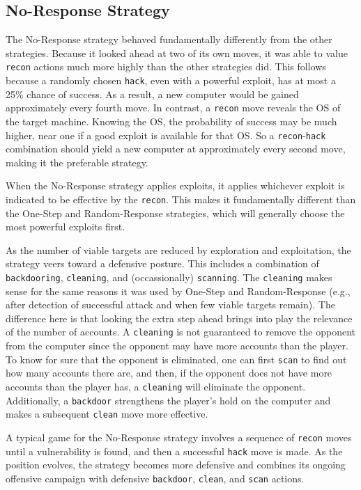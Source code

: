 \documentclass{sig-alternate-05-2015}
\begin{document}
\subsection{No-Response Strategy}
The No-Response strategy behaved fundamentally differently from the other strategies.
Because it looked ahead at two of its own moves, it was able to value {\tt recon} actions much more highly than the other strategies did.
This follows because a randomly chosen {\tt hack}, even with a powerful exploit, has at most a 25\% chance of success.
As a result, a new computer would be gained approximately every fourth move.
In contrast, a {\tt recon} move reveals the OS of the target machine.
Knowing the OS, the probability of success may be much higher, near one if a good exploit is available for that OS.
So a {\tt recon}-{\tt hack} combination should yield a new computer at approximately every second move, making it the preferable strategy.

When the No-Response strategy applies exploits, it applies whichever exploit is indicated to be effective by the {\tt recon}.
This makes it fundamentally different than the One-Step and Random-Response strategies, which will generally choose the most powerful exploits first.

As the number of viable targets are reduced by exploration and exploitation, the strategy veers toward a defensive posture.
This includes a combination of {\tt backdooring}, {\tt cleaning}, and (occassionally) {\tt scanning}.
The {\tt cleaning} makes sense for the same reasons it was used by One-Step and Random-Response (e.g., after detection of successful attack and when few viable targets remain).
The difference here is that looking the extra step ahead brings into play the relevance of the number of accounts.
A {\tt cleaning} is not guaranteed to remove the opponent from the computer since the opponent may have more accounts than the player.
To know for sure that the opponent is eliminated, one can first {\tt scan} to find out how many accounts there are, and then, if the opponent does not have more accounts than the player has, a {\tt cleaning} will eliminate the opponent.
Additionally, a {\tt backdoor} strengthens the player's hold on the computer and makes a subsequent {\tt clean} move more effective.

A typical game for the No-Response strategy involves a sequence of {\tt recon} moves until a vulnerability is found, and then a successful {\tt hack} move is made.
As the position evolves, the strategy becomes more defensive and combines its ongoing offensive campaign with defensive {\tt backdoor}, {\tt clean}, and  {\tt scan} actions.
\end{document}
